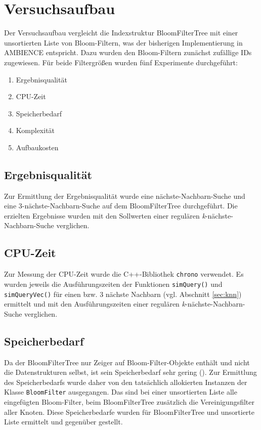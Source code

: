 \section{Versuchsaufbau}\label{sec:versuchsaufbau}
Der Versuchsaufbau vergleicht die Indexstruktur BloomFilterTree mit einer unsortierten Liste von Bloom-Filtern, was der bisherigen Implementierung in AMBIENCE entspricht. Dazu wurden den Bloom-Filtern zunächst zufällige IDs zugewiesen. Für beide Filtergrößen wurden fünf Experimente durchgeführt:  
\begin{enumerate}
	\item Ergebnisqualität
	\item CPU-Zeit 
	\item Speicherbedarf 
	\item Komplexität 
	\item Aufbaukosten 
\end{enumerate}
\subsection{Ergebnisqualität}\label{sec:ergebnisqualität}
Zur Ermittlung der Ergebnisqualität wurde eine nächste-Nachbarn-Suche und eine 3-nächste-Nachbarn-Suche auf dem BloomFilterTree durchgeführt. Die erzielten Ergebnisse wurden mit den Sollwerten einer regulären \textit{k}-nächste-Nachbarn-Suche verglichen. 
\subsection{CPU-Zeit}\label{sec:cpu-zeit}
Zur Messung der CPU-Zeit wurde die C++-Bibliothek \texttt{chrono} verwendet. Es wurden jeweils die Ausführungszeiten der Funktionen \texttt{simQuery()} und \texttt{simQueryVec()} für einen bzw. 3 nächste Nachbarn (vgl. Abschnitt \ref{sec:knn}) ermittelt und mit den Ausführungszeiten einer regulären \textit{k}-nächste-Nachbarn-Suche verglichen. 
\subsection{Speicherbedarf}\label{sec:speicherbedarf}
Da der BloomFilterTree nur Zeiger auf Bloom-Filter-Objekte enthält und nicht die Datenstrukturen selbst, ist sein Speicherbedarf sehr gering (). %
Zur Ermittlung des Speicherbedarfs wurde daher von den tatsächlich allokierten Instanzen der Klasse \texttt{BloomFilter} ausgegangen. Das sind bei einer unsortierten Liste alle eingefügten Bloom-Filter, beim BloomFilterTree zusätzlich die Vereinigungsfilter aller Knoten. Diese Speicherbedarfe wurden für BloomFilterTree und unsortierte Liste ermittelt und gegenüber gestellt. 
